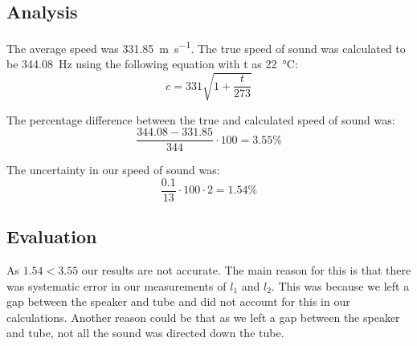 \subsection{Analysis}
The average speed was \SI{331.85}{\metre\per\second}. The true speed of sound was calculated to be \SI{344.08}{\hertz} using the following equation with t as \SI{22}{\celsius}:
\begin{equation}
  c=331 \sqrt{1 + \frac{t}{273}}
\end{equation}

The percentage difference between the true and calculated speed of sound was:
\begin{equation}
  \frac{344.08-331.85}{344} \cdot 100 = 3.55 \%
\end{equation}

The uncertainty in our speed of sound was:
\begin{equation}
  \frac{0.1}{13} \cdot 100 \cdot 2 = 1.54\%
\end{equation}


\subsection{Evaluation}
As $1.54<3.55$ our results are not accurate.
The main reason for this is that there was systematic error in our measurements of $l_1$ and $l_2$.
This was because we left a gap between the speaker and tube and did not account for this in our calculations.
Another reason could be that as we left a gap between the speaker and tube, not all the sound was directed down the tube.
